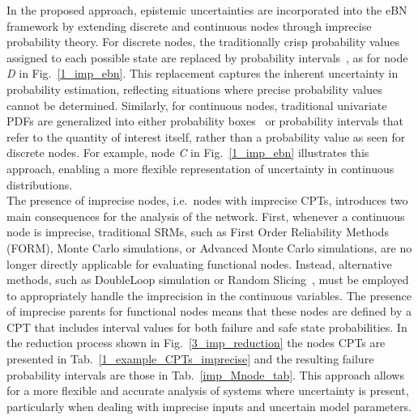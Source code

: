 In the proposed approach, epistemic uncertainties are incorporated into the eBN framework by extending discrete and continuous nodes through imprecise probability theory.
For discrete nodes, the traditionally crisp probability values assigned to each possible state are replaced by probability intervals~\cite{weichselberger_theory_2000}, as for node \textit{D} in Fig.~\ref{1_imp_ebn}. 
This replacement captures the inherent uncertainty in probability estimation, reflecting situations where precise probability values cannot be determined. Similarly, for continuous nodes, traditional univariate PDFs are generalized into either probability boxes~\cite{ferson_2003} or probability intervals that refer to the quantity of interest itself, rather than a probability value as seen for discrete nodes. 
For example, node \textit{C} in Fig.~\ref{1_imp_ebn} illustrates this approach, enabling a more flexible representation of uncertainty in continuous distributions.\\

The presence of imprecise nodes, i.e.\ nodes with imprecise CPTs, introduces two main consequences for the analysis of the network. 
First, whenever a continuous node is imprecise, traditional SRMs, such as First Order Reliability Methods (FORM), Monte Carlo simulations, or Advanced Monte Carlo simulations, are no longer directly applicable for evaluating functional nodes. 
Instead, alternative methods, such as DoubleLoop simulation or Random Slicing~\cite{ALVAREZ_randomslicing}, must be employed to appropriately handle the imprecision in the continuous variables. 
The presence of imprecise parents for functional nodes means that these nodes are defined by a CPT that includes interval values for both failure and safe state probabilities. In the reduction process shown in Fig.~\ref{3_imp_reduction} the nodes CPTs are presented in Tab.~\ref{1_example_CPTs_imprecise} and the resulting failure probability intervals are those in Tab.~\ref{imp_Mnode_tab}. 
This approach allows for a more flexible and accurate analysis of systems where uncertainty is present, particularly when dealing with imprecise inputs and uncertain model parameters.


